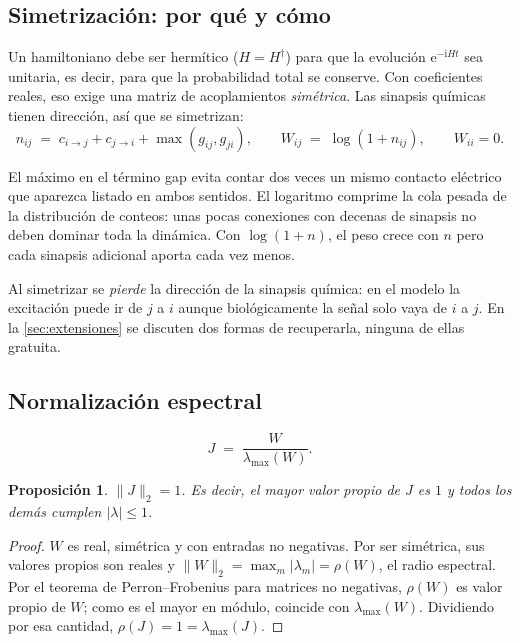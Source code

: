 \documentclass[11pt,a4paper]{article}
\newcommand{\e}{\mathrm{e}}
\newcommand{\ii}{\mathrm{i}}
\theoremstyle{plain}
\newtheorem{proposicion}{Proposición}[section]
\theoremstyle{definition}
\theoremstyle{remark}
\begin{document}
\subsection{Simetrización: por qué y cómo}

Un hamiltoniano debe ser hermítico ($H=H^\dagger$) para que la evolución $\e^{-\ii Ht}$ sea unitaria, es decir, para que la probabilidad total se conserve. Con coeficientes reales, eso exige una matriz de acoplamientos \emph{simétrica}. Las sinapsis químicas tienen dirección, así que se simetrizan:
\begin{equation}
n_{ij} \;=\; c_{i\to j} + c_{j\to i} + \max(g_{ij},g_{ji}),
\qquad
W_{ij} \;=\; \log\!\left(1+n_{ij}\right),
\qquad W_{ii}=0 .
\label{eq:pesos}
\end{equation}

El máximo en el término gap evita contar dos veces un mismo contacto eléctrico que aparezca listado en ambos sentidos. El logaritmo comprime la cola pesada de la distribución de conteos: unas pocas conexiones con decenas de sinapsis no deben dominar toda la dinámica. Con $\log(1+n)$, el peso crece con $n$ pero cada sinapsis adicional aporta cada vez menos.

\begin{honestidad}
Al simetrizar se \emph{pierde} la dirección de la sinapsis química: en el modelo la excitación puede ir de $j$ a $i$ aunque biológicamente la señal solo vaya de $i$ a $j$. En la \cref{sec:extensiones} se discuten dos formas de recuperarla, ninguna de ellas gratuita.
\end{honestidad}

\subsection{Normalización espectral}

\begin{equation}
J \;=\; \frac{W}{\lambda_{\max}(W)} .
\label{eq:normalizacion}
\end{equation}

\begin{proposicion}\label{prop:norma}
$\lVert J\rVert_2 = 1$. Es decir, el mayor valor propio de $J$ es $1$ y todos los demás cumplen $|\lambda|\le 1$.
\end{proposicion}

\begin{proof}
$W$ es real, simétrica y con entradas no negativas. Por ser simétrica, sus valores propios son reales y $\lVert W\rVert_2=\max_m|\lambda_m|=\rho(W)$, el radio espectral. Por el teorema de Perron--Frobenius para matrices no negativas, $\rho(W)$ es valor propio de $W$; como es el mayor en módulo, coincide con $\lambda_{\max}(W)$. Dividiendo por esa cantidad, $\rho(J)=1=\lambda_{\max}(J)$.
\end{proof}
\end{document}

